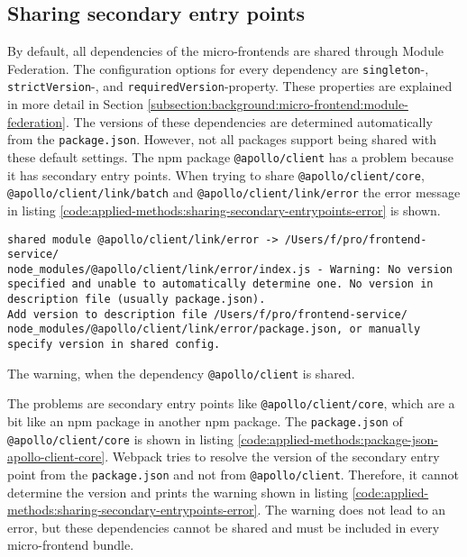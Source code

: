 \subsection{Sharing secondary entry points}\label{subsection:applied-methods:prototypical-implementation:sharing
-secondary-entrypoints}

By default, all dependencies of the micro-frontends are shared through Module Federation. The configuration options for every dependency are \texttt{singleton}-, \texttt{strictVersion}-, and \texttt{requiredVersion}-property. These properties are explained in more detail in Section \ref{subsection:background:micro-frontend:module-federation}. The versions of these dependencies are determined automatically from the \texttt{package.json}. However, not all packages support being shared with these default settings. The npm package \texttt{@apollo/client} has a problem because it has secondary entry points. When trying to share \texttt{@apollo/client/core}, \texttt{@apollo/client/link/batch} and \texttt{@apollo/client/link/error} the error message in listing \ref{code:applied-methods:sharing-secondary-entrypoints-error} is shown.

\ifshowListings
\begin{listing}[H]
    \begin{verbatim}
shared module @apollo/client/link/error -> /Users/f/pro/frontend-service/
node_modules/@apollo/client/link/error/index.js - Warning: No version 
specified and unable to automatically determine one. No version in 
description file (usually package.json).
Add version to description file /Users/f/pro/frontend-service/
node_modules/@apollo/client/link/error/package.json, or manually 
specify version in shared config.
    \end{verbatim}
    \caption{The warning, when the dependency \texttt{@apollo/client} is shared.}\label{code:applied-methods:sharing-secondary-entrypoints-error}
\end{listing}
\fi


\noindent The problems are secondary entry points like \texttt{@apollo/client/core}, which are a bit like an npm package in another npm package. The \texttt{package.json} of \texttt{@apollo/client/core} is shown in listing \ref{code:applied-methods:package-json-apollo-client-core}. Webpack tries to resolve the version of the secondary entry point from the \texttt{package.json} and not from \texttt{@apollo/client}. Therefore, it cannot determine the version and prints the warning shown in listing \ref{code:applied-methods:sharing-secondary-entrypoints-error}. The warning does not lead to an error, but these dependencies cannot be shared and must be included in every micro-frontend bundle.

